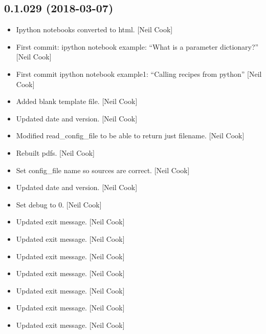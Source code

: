 \documentclass[a4paper,10pt,english]{report}
\begin{document}
\subsection{0.1.029 (2018-03-07)}
\label{\detokenize{misc/changelog:id473}}\begin{itemize}
\item {} 
Ipython notebooks converted to html. {[}Neil Cook{]}

\item {} 
First commit: ipython notebook example: “What is a parameter
dictionary?” {[}Neil Cook{]}

\item {} 
First commit ipython notebook example1: “Calling recipes from python”
{[}Neil Cook{]}

\item {} 
Added blank template file. {[}Neil Cook{]}

\item {} 
Updated date and version. {[}Neil Cook{]}

\item {} 
Modified read\_config\_file to be able to return just filename. {[}Neil
Cook{]}

\item {} 
Rebuilt pdfs. {[}Neil Cook{]}

\item {} 
Set config\_file name so sources are correct. {[}Neil Cook{]}

\item {} 
Updated date and version. {[}Neil Cook{]}

\item {} 
Set debug to 0. {[}Neil Cook{]}

\item {} 
Updated exit message. {[}Neil Cook{]}

\item {} 
Updated exit message. {[}Neil Cook{]}

\item {} 
Updated exit message. {[}Neil Cook{]}

\item {} 
Updated exit message. {[}Neil Cook{]}

\item {} 
Updated exit message. {[}Neil Cook{]}

\item {} 
Updated exit message. {[}Neil Cook{]}

\item {} 
Updated exit message. {[}Neil Cook{]}


\end{itemize}
\end{document}
